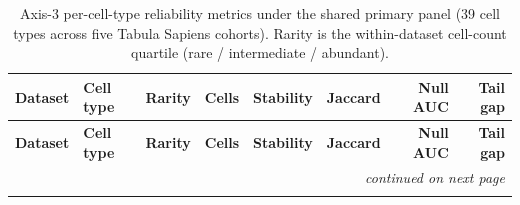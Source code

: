 \documentclass[a4paper,11pt]{article}
\begin{document}
\begin{longtable}{l l l r r r r r}
\caption{Axis-3 per-cell-type reliability metrics under the shared
primary panel (39 cell types across five Tabula Sapiens cohorts).
Rarity is the within-dataset cell-count quartile (rare /
intermediate / abundant).}
\label{tab:s3} \\
\toprule
\textbf{Dataset} & \textbf{Cell type} & \textbf{Rarity} &
\textbf{Cells} & \textbf{Stability} & \textbf{Jaccard} &
\textbf{Null AUC} & \textbf{Tail gap} \\
\midrule
\endfirsthead

\toprule
\textbf{Dataset} & \textbf{Cell type} & \textbf{Rarity} &
\textbf{Cells} & \textbf{Stability} & \textbf{Jaccard} &
\textbf{Null AUC} & \textbf{Tail gap} \\
\midrule
\endhead

\midrule
\multicolumn{8}{r}{\textit{continued on next page}} \\
\endfoot

\bottomrule
\endlastfoot


\end{longtable}
\end{document}
